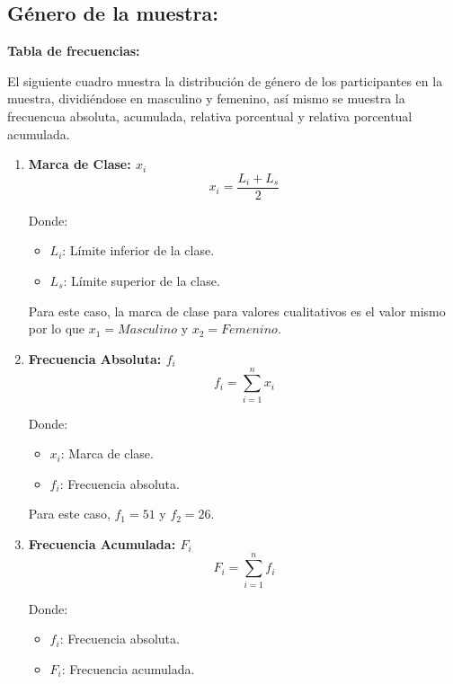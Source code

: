 \subsection{Género de la muestra:}
  
  \textbf{Tabla de frecuencias:}
  
  El siguiente cuadro muestra la distribución de género de los participantes en la muestra, dividiéndose en masculino y femenino, así mismo se muestra la frecuencua absoluta, acumulada, relativa porcentual y relativa porcentual acumulada.

  \begin{multicols}{2}
    \begin{enumerate}
      \item \begin{center}
        \textbf{Marca de Clase: $x_i$}
        \hrulefill
        \begin{equation*}
            x_i = \dfrac{L_i + L_s}{2}
        \end{equation*}
    \end{center}
    \vspace{-0.5cm}
    Donde:
    \begin{itemize}
        \item $L_i$: Límite inferior de la clase.
        \item $L_s$: Límite superior de la clase.
    \end{itemize}
    Para este caso, la marca de clase para valores cualitativos es el valor mismo por lo que $x_1 = Masculino$ y $x_2 = Femenino$.

    \item \begin{center}
        \textbf{Frecuencia Absoluta: $f_i$}
        \hrulefill
        \begin{equation*}
          f_i = \sum_{i=1}^{n} x_i
        \end{equation*}
    \end{center}
    \vspace{-0.7cm}
    Donde:
    \begin{itemize}
        \item $x_i$: Marca de clase.
        \item $f_i$: Frecuencia absoluta.
    \end{itemize}
    Para este caso, $f_1 = 51$ y $f_2 = 26$.

    \item \begin{center}
      \textbf{Frecuencia Acumulada: $F_i$}
      \hrulefill
      \begin{equation*}
        F_i = \sum_{i=1}^{n} f_i
      \end{equation*}
    \end{center}
    \vspace{-0.5cm}
    Donde:
    \begin{itemize}
        \item $f_i$: Frecuencia absoluta.
        \item $F_i$: Frecuencia acumulada.
    \end{itemize}


\end{enumerate}
\end{multicols}
